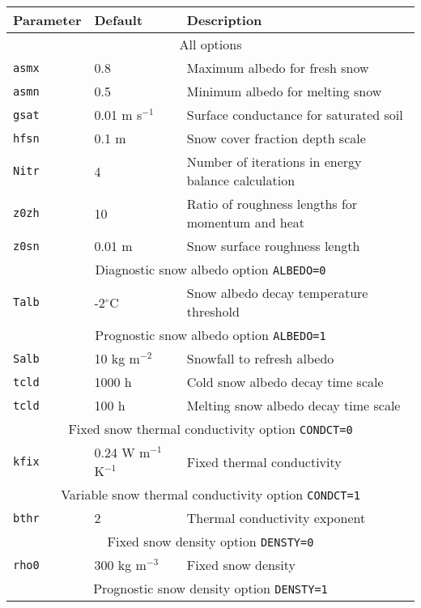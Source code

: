 \documentclass{article}
\begin{document}
\begin{tabular}{|l|l|l|}
\hline
Parameter & Default & Description \\
\hline
\hline 
\multicolumn{3}{|c|}{All options} \\
\hline 
{\tt asmx} & 0.8    & Maximum albedo for fresh snow                      \\
{\tt asmn} & 0.5    & Minimum albedo for melting snow                    \\
{\tt gsat} & 0.01 m s$^{-1}$ & Surface conductance for saturated soil    \\
{\tt hfsn} & 0.1 m  & Snow cover fraction depth scale                    \\
{\tt Nitr} & 4      & Number of iterations in energy balance calculation \\
{\tt z0zh} & 10     & Ratio of roughness lengths for momentum and heat   \\
{\tt z0sn} & 0.01 m & Snow surface roughness length                      \\
\hline 
\hline 
\multicolumn{3}{|c|}{Diagnostic snow albedo option {\tt ALBEDO=0}} \\
\hline 
{\tt Talb} & -2$^\circ$C & Snow albedo decay temperature threshold  \\
\hline 
\hline 
\multicolumn{3}{|c|}{Prognostic snow albedo option {\tt ALBEDO=1}} \\
\hline 
{\tt Salb} & 10 kg m$^{-2}$ & Snowfall to refresh albedo           \\
{\tt tcld} & 1000 h         & Cold snow albedo decay time scale    \\
{\tt tcld} & 100 h          & Melting snow albedo decay time scale \\
\hline 
\hline 
\multicolumn{3}{|c|}{Fixed snow thermal conductivity option {\tt CONDCT=0}}    \\
\hline 
{\tt kfix} & 0.24 W m$^{-1}$ K$^{-1}$ & Fixed thermal conductivity               \\
\hline
\hline 
\multicolumn{3}{|c|}{Variable snow thermal conductivity option {\tt CONDCT=1}} \\
\hline 
{\tt bthr} & 2 & Thermal conductivity exponent                                   \\
\hline
\hline 
\multicolumn{3}{|c|}{Fixed snow density option {\tt DENSTY=0}} \\
\hline 
{\tt rho0} & 300 kg m$^{-3}$ & Fixed snow density \\
\hline
\hline 
\multicolumn{3}{|c|}{Prognostic snow density option {\tt DENSTY=1}} \\

\end{tabular}
\end{document}
